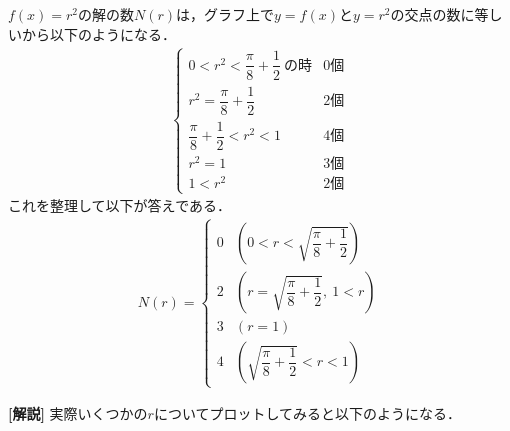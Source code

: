 \documentclass[../../main.tex]{subfiles}
\begin{document}
$f(x)=r^2$の解の数$N(r)$は，グラフ上で$y=f(x)$と$y=r^2$の交点の数に等しいから以下のようになる．
\begin{align}
  \begin{cases}\displaystyle
    0<r^2<\dfrac{\pi}{8}+\dfrac{1}{2}\ \text{の時} & 0\text{個} \\
    r^2=\dfrac{\pi}{8}+\dfrac{1}{2} & 2\text{個} \\
    \dfrac{\pi}{8}+\dfrac{1}{2}<r^2<1 & 4\text{個} \\
    r^2=1 & 3\text{個} \\
    1<r^2 & 2\text{個}
  \end{cases}
\end{align}
これを整理して以下が答えである．
\begin{align}
  N(r)=
  \begin{cases}\displaystyle
    0 & \left(0<r<\sqrt{\dfrac{\pi}{8}+\dfrac{1}{2}}\right) \\
    2 & \left(r=\sqrt{\dfrac{\pi}{8}+\dfrac{1}{2}},\ 1<r\right) \\
    3 & (r=1) \\
    4 & \left(\sqrt{\dfrac{\pi}{8}+\dfrac{1}{2}}<r<1\right)
  \end{cases}
\end{align}

{\bf [解説]}
実際いくつかの$r$についてプロットしてみると以下のようになる．
\end{document}

